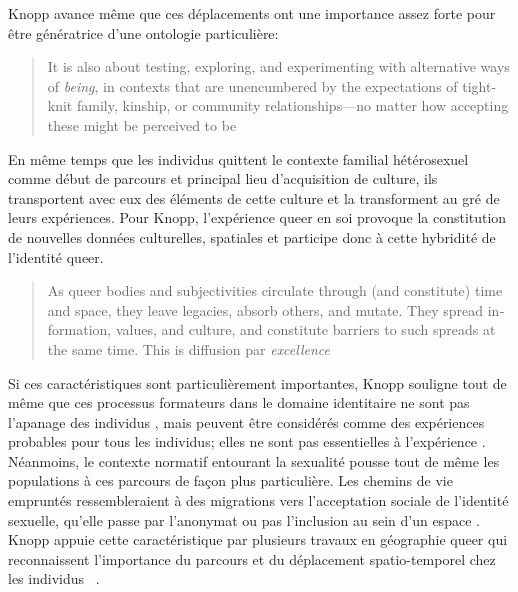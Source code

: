 Knopp avance même que ces déplacements ont une importance assez forte pour être génératrice d'une ontologie particulière:
\foreignblockquote{english}[{\cite[123]{Knopp2004}}][.]{It is also about testing, exploring, and experimenting with alternative ways of \emph{being}, in contexts that are unencumbered by the expectations of tight-knit family, kinship, or community relationships—no matter how accepting these might be perceived to be} 
En même temps que les individus \lgbt{} quittent le contexte familial hétérosexuel comme début de parcours et principal lieu d'acquisition de culture, ils transportent avec eux des éléments de cette culture et la transforment au gré de leurs expériences. 
Pour Knopp, l'expérience queer en soi provoque la constitution de nouvelles données culturelles, spatiales et participe donc à cette hybridité de l'identité queer.
\foreignblockquote{english}[{\cite[130]{Knopp2004}}][.]{As queer bodies and subjectivities circulate through (and constitute) time and space, they leave legacies, absorb others, and mutate. They spread information, values, and culture, and constitute barriers to such spreads at the same time. This is diffusion par \emph{excellence}}

Si ces caractéristiques sont particulièrement importantes, Knopp souligne tout de même que ces processus formateurs dans le domaine identitaire ne sont pas l'apanage des individus \lgbt{}, mais peuvent être considérés comme des expériences probables pour tous les individus; elles ne sont pas essentielles à l'expérience \lgbt{}.
Néanmoins, le contexte normatif entourant la sexualité pousse tout de même les populations \lgbt{} à ces parcours de façon plus particulière. 
Les chemins de vie empruntés ressembleraient à des migrations vers l'acceptation sociale de l'identité sexuelle, qu'elle passe par l'anonymat ou pas l'inclusion au sein d'un espace \lgbt{}. 
Knopp appuie cette caractéristique par plusieurs travaux en géographie queer qui reconnaissent l'importance du parcours et du déplacement spatio-temporel chez les individus \lgbt{}~\citep[123]{Knopp2004}.



